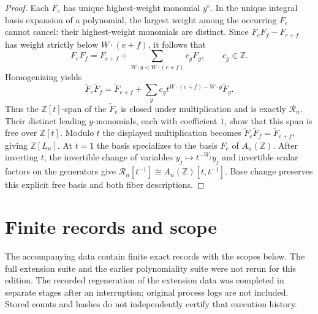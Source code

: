\documentclass[11pt]{article}
\theoremstyle{definition}
\theoremstyle{remark}
\newcommand{\Z}{\mathbb Z}
\begin{document}
\begin{proof}
Each $F_e$ has unique highest-weight monomial $y^e$. In the unique integral
basis expansion of a polynomial, the largest weight among the occurring
$F_e$ cannot cancel: their highest-weight monomials are distinct. Since
$F_eF_f-F_{e+f}$ has weight strictly below $W\cdot(e+f)$, it follows that
\[
 F_eF_f=F_{e+f}+\sum_{W\cdot g<W\cdot(e+f)}c_gF_g,
 \qquad c_g\in\Z.
\]
Homogenizing yields
\[
 \widetilde F_e\widetilde F_f
 =\widetilde F_{e+f}+
   \sum_g c_g t^{W\cdot(e+f)-W\cdot g}\widetilde F_g.
\]
Thus the $\Z[t]$-span of the $\widetilde F_e$ is closed under multiplication
and is exactly $\mathcal R_n$. Their distinct leading $y$-monomials, each
with coefficient $1$, show that this span is free over $\Z[t]$.
Modulo $t$ the displayed multiplication becomes
$\widetilde F_e\widetilde F_f=\widetilde F_{e+f}$, giving $\Z[L_n]$.
At $t=1$ the basis specializes to the basis $F_e$ of $A_n(\Z)$.
After inverting $t$, the invertible change of variables
$y_j\mapsto t^{-W_j}y_j$ and invertible scalar factors on the generators give
$\mathcal R_n[t^{-1}]\cong A_n(\Z)[t,t^{-1}]$.
Base change preserves this explicit free basis and both fiber descriptions.
\end{proof}

\section{Finite records and scope}\label{sec:verification}
The accompanying data contain finite exact records with the scopes below.
The full extension suite and the earlier polynomiality suite were not rerun
for this edition. The recorded regeneration of the extension data was
completed in separate stages after an interruption; original process logs
are not included. Stored counts and hashes do not independently certify
that execution history.
\end{document}
